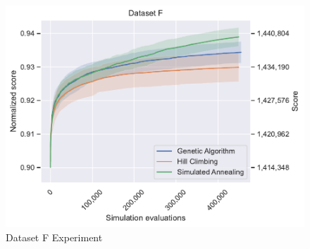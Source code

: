\begin{figure}
    \centering
    \includegraphics[width=\linewidth]{img/experiments/f_Genetic Algorithm_Hill Climbing_Simulated Annealing.pdf}
    \caption[Dataset F Experiment]{
        Dataset F Experiment
    }
    \label{fig:dataset_f_experiment}
\end{figure}




